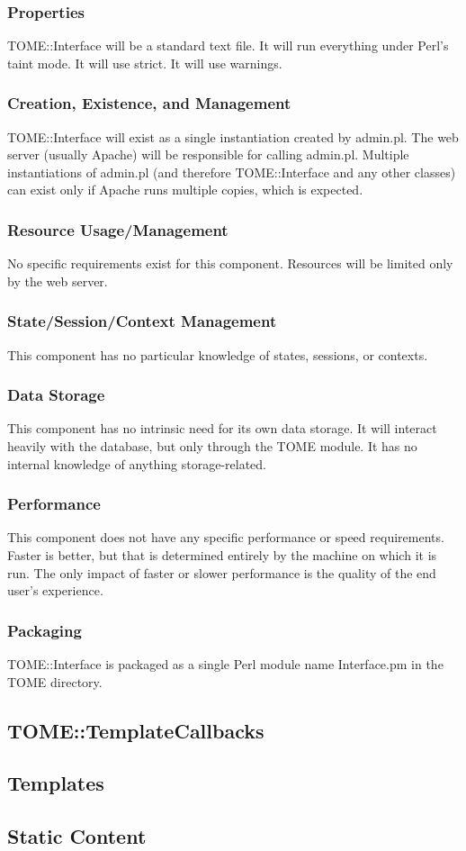 \documentclass[12pt,titlepage]{article}
\begin{document}
\subsubsection{Properties}
TOME::Interface will be a standard text file.  It will run everything under Perl's taint mode.  It will use strict.  It will use warnings. 
\subsubsection{Creation, Existence, and Management}
TOME::Interface will exist as a single instantiation created by admin.pl.  The web server (usually Apache) will be responsible for calling admin.pl.  Multiple instantiations of admin.pl (and therefore TOME::Interface and any other classes) can exist only if Apache runs multiple copies, which is expected.
\subsubsection{Resource Usage/Management}
No specific requirements exist for this component.  Resources will be limited only by the web server.
\subsubsection{State/Session/Context Management}
This component has no particular knowledge of states, sessions, or contexts.
\subsubsection{Data Storage}
This component has no intrinsic need for its own data storage.  It will interact heavily with the database, but only through the TOME module.  It has no internal knowledge of anything storage-related.
\subsubsection{Performance}
This component does not have any specific performance or speed requirements.  Faster is better, but that is determined entirely by the machine on which it is run.  The only impact of faster or slower performance is the quality of the end user's experience.
\subsubsection{Packaging}
TOME::Interface is packaged as a single Perl module name Interface.pm in the TOME directory.


\subsection{TOME::TemplateCallbacks}
\subsection{Templates}
\subsection{Static Content}
\end{document}
